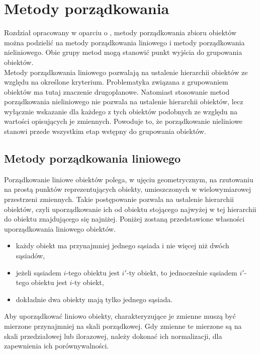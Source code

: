 \documentclass[12pt,a4paper]{report}
\begin{document}
\chapter{Metody porządkowania}
\noindent

Rozdział opracowany w oparciu o \cite[Rozdział 2]{panek2013}, metody porządkowania zbioru obiektów można podzielić na metody porządkowania liniowego i metody porządkowania nieliniowego. Obie grupy metod mogą stanowić punkt wyjścia do grupowania obiektów. \\
Metody porządkowania liniowego pozwalają na ustalenie hierarchii obiektów ze względu na określone kryterium. Problematyka związana z grupowaniem obiektów ma tutaj znaczenie drugoplanowe. Natomiast stosowanie metod porządkowania nieliniowego nie pozwala na ustalenie hierarchii obiektów, lecz wyłącznie wskazanie dla każdego z tych obiektów podobnych ze względu na wartości opisujących je zmiennych. Powoduje to, że porządkowanie nieliniowe stanowi przede wszystkim etap wstępny do grupowania obiektów.\\

\section{Metody porządkowania liniowego}
\noindent

Porządkowanie liniowe obiektów polega, w ujęciu geometrycznym, na rzutowaniu na prostą punktów reprezentujących obiekty, umieszczonych w wielowymiarowej przestrzeni zmiennych. Takie postępowanie pozwala na ustalenie hierarchii obiektów, czyli uporządkowanie ich od obiektu stojącego najwyżej w tej hierarchii do obiektu znajdującego się najniżej. Poniżej zostaną przedstawione własności uporządkowania liniowego obiektów.\\

\begin{itemize}
\item każdy obiekt ma przynajmniej jednego sąsiada i nie więcej niż dwóch sąsiadów,
\item jeżeli sąsiadem $i$-tego obiektu jest $i'$-ty obiekt, to jednocześnie sąsiadem $i'$-tego obiektu jest $i$-ty obiekt,
\item dokładnie dwa obiekty mają tylko jednego sąsiada.\\
\end{itemize}
\noindent

Aby uporządkować liniowo obiekty, charakteryzujące je zmienne muszą być mierzone przynajmniej na skali porządkowej. Gdy zmienne te mierzone są na skali przedziałowej lub ilorazowej, należy dokonać ich normalizacji, dla zapewnienia ich porównywalności.
\end{document}
